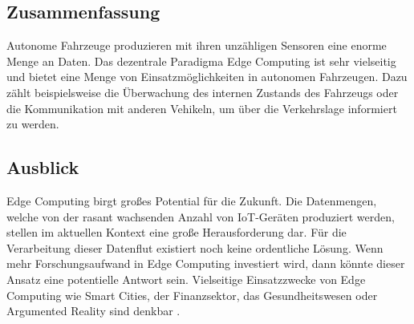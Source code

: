 \documentclass{sigchi}
\begin{document}
\subsection{Zusammenfassung}
Autonome Fahrzeuge produzieren mit ihren unzähligen Sensoren eine enorme Menge an Daten. Das dezentrale Paradigma Edge Computing ist sehr vielseitig und bietet eine Menge von Einsatzmöglichkeiten in autonomen Fahrzeugen. Dazu zählt beispielsweise die Überwachung des internen Zustands des Fahrzeugs oder die Kommunikation mit anderen Vehikeln, um über die Verkehrslage informiert zu werden.

\subsection{Ausblick}
Edge Computing birgt großes Potential für die Zukunft. Die Datenmengen, welche von der rasant wachsenden Anzahl von IoT-Geräten produziert werden, stellen im aktuellen Kontext eine große Herausforderung dar. Für die Verarbeitung dieser Datenflut existiert noch keine ordentliche Lösung. Wenn mehr Forschungsaufwand in Edge Computing investiert wird, dann könnte dieser Ansatz eine potentielle Antwort sein. Vielseitige Einsatzzwecke von Edge Computing wie Smart Cities, der Finanzsektor, das Gesundheitswesen oder Argumented Reality sind denkbar \cite{5-use-cases-1:2019}.


\balance{}



\end{document}
